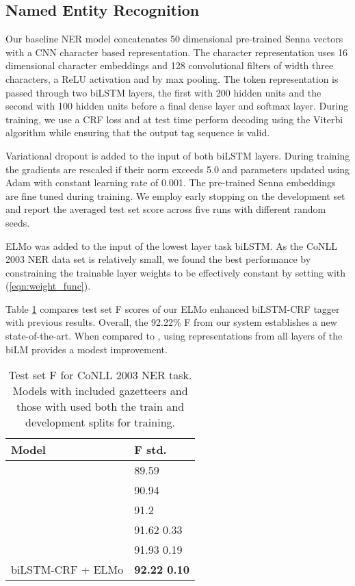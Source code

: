 \documentclass[11pt,a4paper]{article}
\newcommand{\ELMO}{ELMo}
\begin{document}
\subsection{Named Entity Recognition}
Our baseline NER model concatenates 50 dimensional pre-trained Senna vectors \citep{NLPfromScratch:Collobert2011} with a CNN character based representation.  The character representation uses 16 dimensional character embeddings and 128 convolutional filters of width three characters, a ReLU activation and by max pooling.  The token representation is passed through two biLSTM layers, the first with 200 hidden units and the second with 100 hidden units before a final dense layer and softmax layer.
During training, we use a CRF loss and at test time perform decoding using the Viterbi algorithm while ensuring that the output tag sequence is valid.

Variational dropout is added to the input of both biLSTM layers.
During training the gradients are rescaled if their  norm exceeds 5.0 and parameters updated using Adam with constant learning rate of 0.001.
The pre-trained Senna embeddings are fine tuned during training.
We employ early stopping on the development set and report the averaged test set score across five runs with different random seeds.

\ELMO{} was added to the input of the lowest layer task biLSTM.
As the CoNLL 2003 NER data set is relatively small, we found the best performance by
constraining the trainable layer weights to be effectively constant by setting  with (\ref{eqn:weight_func}).

Table \ref{table:ner_test} compares test set F scores of our \ELMO{} enhanced biLSTM-CRF tagger with previous results. 
Overall, the 92.22\% F from our system establishes a new state-of-the-art.
When compared to \citet{Peters2017SemisupervisedST}, using representations from all layers of the biLM provides a modest improvement.



\begin{table}
\centering
\begin{tabular}{l|l}
\textbf{Model}                                & \textbf{F  std.} \\ \hline \hline
\citet{NLPfromScratch:Collobert2011} & 89.59 \\
\citet{lample-EtAl:2016:N16-1} & 90.94 \\
\citet{Ma2016EndtoendSL}                & 91.2     \\
\citet{chiu-nichols-2016}         & 91.62  0.33  \\
\citet{Peters2017SemisupervisedST}     & 91.93  0.19   \\
biLSTM-CRF + \ELMO   & \textbf{92.22  0.10}
\end{tabular}
\caption{Test set F for CoNLL 2003 NER task.
Models with  included gazetteers and those with  used both the train and development splits for training.
}
\label{table:ner_test}
\end{table}
\end{document}
